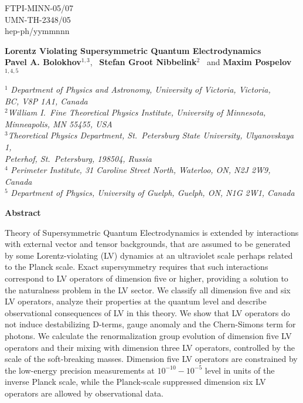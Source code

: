 \documentclass[12pt]{revtex4}
\begin{document}
\begin{titlepage}
\renewcommand{\thefootnote}{\fnsymbol{footnote}}

\begin{flushright}
FTPI-MINN-05/07\\
UMN-TH-2348/05\\
hep-ph/yymmnnn
\end{flushright}
\vskip -1cm
\begin{center}
\vspace{0.5cm}

\large {\bf Lorentz Violating Supersymmetric Quantum Electrodynamics}\\[3mm] 
  
\vspace*{0.5cm}
\normalsize
{\bf Pavel A. Bolokhov}$^{1,3}$, ~{\bf Stefan Groot Nibbelink}$^{2}$
\ and
{\bf Maxim Pospelov}$^{1,4,5}$%

\vspace*{0.5cm}
$^{1}$ {\it Department of Physics and Astronomy,
University of Victoria, Victoria,\\ BC, V8P 1A1, Canada}\\
$^{2}${\it William I.\ Fine Theoretical Physics Institute,
University of Minnesota,\\ Minneapolis, MN 55455, USA}\\
$^{3}${\it Theoretical Physics Department, 
St.\ Petersburg State University, Ulyanovskaya 1,\\
Peterhof, St.\ Petersburg, 198504, Russia}\\
$^{4}$ {\it Perimeter Institute, 31 Caroline Street North,
Waterloo, ON,  N2J 2W9,
Canada}\\
$^{5}$ {\it Department of Physics,
 University of Guelph,
 Guelph, ON,  N1G 2W1, Canada}
 \end{center}

\centerline{\large\bf Abstract}

Theory of Supersymmetric Quantum Electrodynamics is extended by 
interactions with external vector and tensor backgrounds, that are 
assumed to be generated by some Lorentz-violating (LV) dynamics at an 
ultraviolet scale perhaps related to the Planck scale. Exact supersymmetry
requires that such interactions correspond to 
LV operators of dimension five or higher, providing a solution 
to the naturalness problem in the LV sector. 
We classify all dimension five and six LV operators,
analyze their properties at the quantum level and describe observational consequences of
LV in this theory. 
We show that LV operators do not induce destabilizing D-terms,
gauge anomaly and the Chern-Simons term for photons. We calculate 
the renormalization group evolution of dimension five LV operators and their 
mixing with dimension three LV operators,
controlled by the scale of the soft-breaking masses. 
Dimension five LV operators are constrained by the low-energy precision measurements
at $10^{-10}-10^{-5}$ level in units of the inverse Planck scale, while the Planck-scale suppressed
dimension six LV operators are allowed by observational data.  





\end{titlepage}
\end{document}
